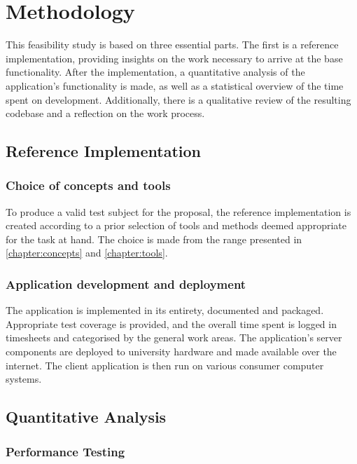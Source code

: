 \chapter{Methodology}
\label{chapter:methodology}

This feasibility study is based on three essential parts. The first is a reference implementation, providing insights on the work necessary to arrive at the base functionality. After the implementation, a quantitative analysis of the application's functionality is made, as well as a statistical overview of the time spent on development. Additionally, there is a qualitative review of the resulting codebase and a reflection on the work process.

\section{Reference Implementation}

\subsection{Choice of concepts and tools}

To produce a valid test subject for the proposal, the reference implementation is created according to a prior selection of tools and methods deemed appropriate for the task at hand. The choice is made from the range presented in \autoref{chapter:concepts} and \autoref{chapter:tools}.

\subsection{Application development and deployment}

The application is implemented in its entirety, documented and packaged. Appropriate test coverage is provided, and the overall time spent is logged in timesheets and categorised by the general work areas. The application's server components are deployed to university hardware and made available over the internet. The client application is then run on various consumer computer systems.

\section{Quantitative Analysis}

\subsection{Performance Testing}

